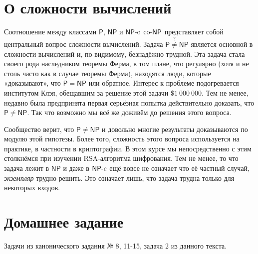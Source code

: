 \documentclass[12pt, leqno]{article}
\theoremstyle{definiton}
\theoremstyle{definition}
\theoremstyle{definition}
\def\PP{{\mathsf{P}}}
\def\NP{{\mathsf{NP}}}
\def\NPc{{\mathsf{NP}}\text{-}{\rm c}}
\def\coNP{{\rm co}\text{-}{\mathsf{NP}}}
\begin{document}
\section{О сложности вычислений}

 Соотношение между классами $\PP$, $\NP$ и $\NPc$ $\coNP$ представляет собой центральный вопрос сложности вычислений.
Задача $\PP \stackrel{?}{\neq} \NP$ является основной в сложности вычислений и, по-видимому, безнадёжно трудной. Эта задача стала своего рода наследником теоремы Ферма, в том плане, что регулярно (хотя и не столь часто как в случае теоремы Ферма), находятся люди, которые «доказывают», что $\PP = \NP$ или обратное. Интерес к проблеме подогревается институтом Клэя, обещавшим за решение этой задачи $\$ 1\ 000\ 000$.  Тем не менее, недавно была предпринята первая серьёзная попытка действительно доказать, что $\PP \neq \NP$. Так что возможно мы всё же доживём до решения этого вопроса.


Сообщество верит, что $\PP \neq \NP$ и довольно многие результаты доказываются по модулю этой гипотезы. Более того, сложность этого вопроса используется на практике, в частности в криптографии. В этом курсе мы непосредственно с этим столкнёмся при изучении RSA-алгоритма шифрования. Тем не менее, то что задача лежит в $\NP$ и даже в $\NPc$ ещё вовсе не означает что её частный случай, \emph{экземпляр}  трудно решить. Это означает лишь, что задача трудна только для некоторых входов.


\section{Домашнее задание}

Задачи из канонического задания № 8, 11-15, задача 2 из данного текста.
\end{document}
